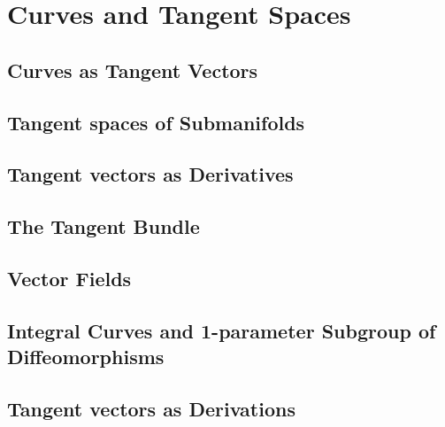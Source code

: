 
\section{Curves and Tangent Spaces}
\label{Section2}

\subsection{Curves as Tangent Vectors}

\subsection{Tangent spaces of Submanifolds}

\subsection{Tangent vectors as Derivatives}

\subsection{The Tangent Bundle}

\subsection{Vector Fields}

\subsection{Integral Curves and 1-parameter Subgroup of Diffeomorphisms}

\subsection{Tangent vectors as Derivations}

\cleardoublepage